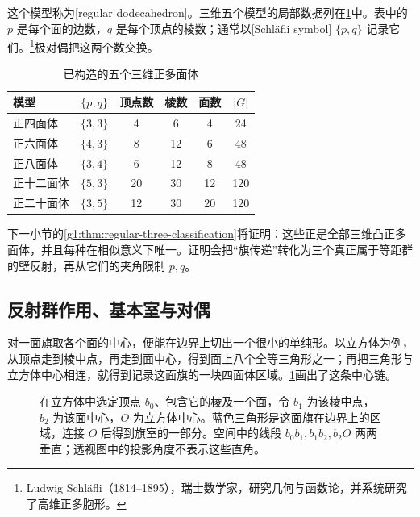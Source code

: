 这个模型称为[regular dodecahedron]。三维五个模型的局部数据列在\cref{g1:tab:regular-three-polytopes}中。表中的 \(p\) 是每个面的边数，\(q\) 是每个顶点的棱数；通常以[Schläfli symbol] \(\{p,q\}\) 记录它们。\footnote{Ludwig Schläfli（1814--1895），瑞士数学家，研究几何与函数论，并系统研究了高维正多胞形。}极对偶把这两个数交换。

\begin{table}[htbp]
	\centering
	\caption{已构造的五个三维正多面体}
	\label{g1:tab:regular-three-polytopes}
	\begin{tabular}{lccccc}
		\toprule
		模型&\(\{p,q\}\)&顶点数&棱数&面数&\(|G|\)\\
		\midrule
		正四面体&\(\{3,3\}\)&4&6&4&24\\
		正六面体&\(\{4,3\}\)&8&12&6&48\\
		正八面体&\(\{3,4\}\)&6&12&8&48\\
		正十二面体&\(\{5,3\}\)&20&30&12&120\\
		正二十面体&\(\{3,5\}\)&12&30&20&120\\
		\bottomrule
	\end{tabular}
\end{table}

下一小节的\cref{g1:thm:regular-three-classification}将证明：这些正是全部三维凸正多面体，并且每种在相似意义下唯一。证明会把“旗传递”转化为三个真正属于等距群的壁反射，再从它们的夹角限制 \(p,q\)。

\subsection{反射群作用、基本室与对偶}
\label{g1:subsec:E03:04}

对一面旗取各个面的中心，便能在边界上切出一个很小的单纯形。以立方体为例，从顶点走到棱中点，再走到面中心，得到面上八个全等三角形之一；再把三角形与立方体中心相连，就得到记录这面旗的一块四面体区域。\cref{g1:fig:polytope-flag-chamber}画出了这条中心链。

\begin{figure}[htbp]
	\centering
	
	\caption[一面旗的中心链]{在立方体中选定顶点 \(b_0\)、包含它的棱及一个面，令 \(b_1\) 为该棱中点，\(b_2\) 为该面中心，\(O\) 为立方体中心。蓝色三角形是这面旗在边界上的区域，连接 \(O\) 后得到旗室的一部分。空间中的线段 \(b_0b_1,b_1b_2,b_2O\) 两两垂直；透视图中的投影角度不表示这些直角。}
	\label{g1:fig:polytope-flag-chamber}
\end{figure}

